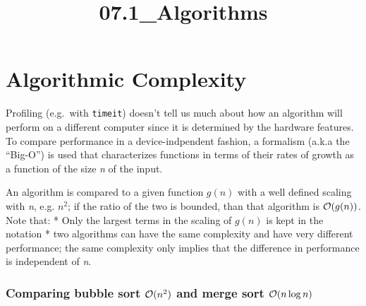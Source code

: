 \documentclass[11pt]{article}
\title{07.1\_Algorithms}
\begin{document}
    
    
    \maketitle
    
    

    
    \hypertarget{algorithmic-complexity}{%
\section{Algorithmic Complexity}\label{algorithmic-complexity}}

Profiling (e.g.~with \texttt{timeit}) doesn't tell us much about how an
algorithm will perform on a different computer since it is determined by
the hardware features. To compare performance in a device-indpendent
fashion, a formalism (a.k.a the ``Big-O'') is used that characterizes
functions in terms of their rates of growth as a function of the size
\emph{n} of the input.

An algorithm is compared to a given function \(g(n)\) with a well
defined scaling with \emph{n}, e.g. \(n^2\); if the ratio of the two is
bounded, than that algorithm is \({\cal O}(g(n))\). Note that: * Only
the largest terms in the scaling of \(g(n)\) is kept in the notation *
two algorithms can have the same complexity and have very different
performance; the same complexity only implies that the difference in
performance is independent of \emph{n}.

\hypertarget{comparing-bubble-sort-cal-on2-and-merge-sort-cal-onlogn}{%
\subsubsection{\texorpdfstring{Comparing bubble sort \({\cal O}(n^2)\)
and merge sort
\({\cal O}(n\log{n})\)}{Comparing bubble sort \{\textbackslash{}cal O\}(n\^{}2) and merge sort \{\textbackslash{}cal O\}(n\textbackslash{}log\{n\})}}\label{comparing-bubble-sort-cal-on2-and-merge-sort-cal-onlogn}}
\end{document}
